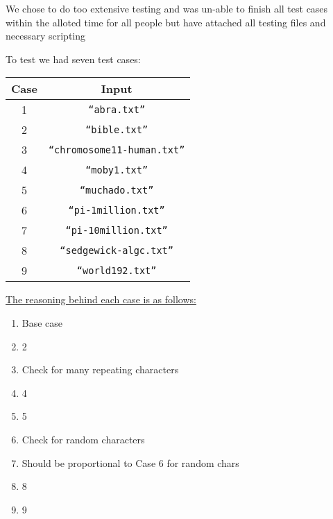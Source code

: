 \documentclass[12pt]{article}
\begin{document}

\newcommand{\hmwkClass}{CSCI 255}
\newcommand{\hmwkSemester}{Spring 2016}

\newcommand{\hmwkAuthorName}{Annamalis \& Lukas}
\newcommand{\hmwkAuthorID}{asharp,lleung}

\newcommand{\hmwkAssignmentNum}{1}

\newcommand{\hmwkProblemNum}{2}

\newcommand{\hmwkCollaborators}{}
\thispagestyle{fancycollab}


\noindent
We chose to do too extensive testing and was un-able to finish all test cases within the alloted time for all people but have attached all testing files and necessary scripting

To test we had seven test cases:
\begin{table}[H]
	\centering
	\begin{tabular}{cc}
		\toprule
		Case & Input \\
		\midrule
		1 & \texttt{``abra.txt''} \\
		2 & \texttt{``bible.txt''} \\
		3 & \texttt{``chromosome11-human.txt''} \\
		4 & \texttt{``moby1.txt''} \\
		5 & \texttt{``muchado.txt''} \\
		6 & \texttt{``pi-1million.txt''} \\
		7 & \texttt{``pi-10million.txt''} \\
		8 & \texttt{``sedgewick-algc.txt''} \\
        9 & \texttt{``world192.txt''} \\
		\bottomrule
	\end{tabular}
\end{table}
\noindent \underline{The reasoning behind each case is as follows:}
\begin{enumerate}
\item Base case
\item 2
\item Check for many repeating characters
\item 4
\item 5
\item Check for random characters
\item Should be proportional to Case 6 for random chars 
\item 8
\item 9
\end{enumerate}
\end{document}
